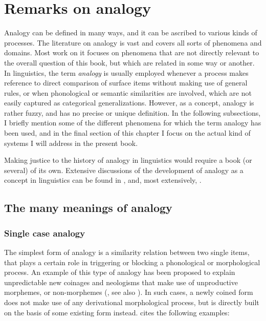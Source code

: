 \chapter{Remarks on analogy}\label{chap:problems}

Analogy can be defined in many ways, and it can be ascribed to various kinds of processes. The literature on analogy is vast and covers all sorts of phenomena and domains. Most work on it focuses on phenomena that are not directly relevant to the overall question of this book, but which are related in some way or another. In linguistics, the term \textit{analogy} is usually employed whenever a process makes reference to direct comparison of surface items without making use of general rules, or when phonological or semantic similarities are involved, which are not easily captured as categorical generalizations. However, as a concept, analogy is rather fuzzy, and has no precise or unique definition. In the following subsections, I briefly mention some of the different phenomena for which the term analogy has been used, and in the final section of this chapter I focus on the actual kind of systems I will address in the present book.

Making justice to the history of analogy in linguistics would require a book (or several) of its own. Extensive discussions of the development of analogy as a concept in linguistics can be found in  \textcite{Anttila.1977}, \textcite{Rainer.2013} and, most extensively, \textcite{Itkonen.2005}.

\section{The many meanings of analogy}

\subsection{Single case analogy}

The simplest form of analogy is a similarity relation between two single items, that plays a certain role in triggering or blocking a phonological or morphological process. An example of this type of analogy has been proposed to explain unpredictable new coinages and neologisms that make use of unproductive morphemes, or non-morphemes (\textcite[195]{Motsch.1977}, see also \textcite{Butterworth.1983}). In such cases, a newly coined form does not make use of any derivational morphological process, but is directly built on the basis of some existing form instead. \textcite[p. 89]{Booij.2010} cites the following examples:

